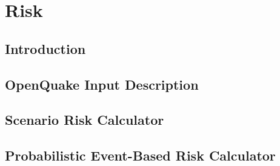 \documentclass[11pt,a4paper,headings=small,dvips]{scrbook}
\begin{document}
\part{Risk}
\chapter{Introduction}
	\label{chap:intrisk}
	
\chapter{OpenQuake Input Description}
	\label{chap:riskinput}
	
\chapter{Scenario Risk Calculator}
	\label{chap:risk_deterministic}
	
\chapter{Probabilistic Event-Based Risk Calculator}
	\label{chap:risk_prob_event_based}
	
\end{document}
